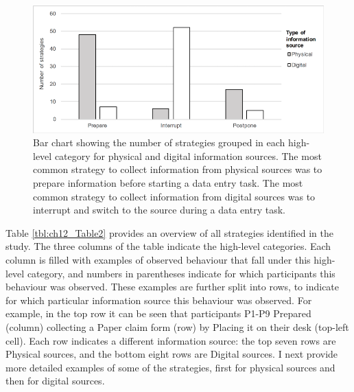 \begin{figure}
\centering
\includegraphics[scale=0.8]{images/ch12/ch12_graph.pdf}
\caption[Study 2 bar chart of interruption strategies]{Bar chart showing the number of strategies grouped in each high-level category for physical and digital information sources. The most common strategy to collect information from physical sources was to prepare information before starting a data entry task. The most common strategy to collect information from digital sources was to interrupt and switch to the source during a data entry task.}
\label{fig:ch12_graph}
\end{figure}

Table \ref{tbl:ch12_Table2} provides an overview of all strategies identified in the study. The three columns of the table indicate the high-level categories. Each column is filled with examples of observed behaviour that fall under this high-level category, and numbers in parentheses indicate for which participants this behaviour was observed. These examples are further split into rows, to indicate for which particular information source this behaviour was observed. For example, in the top row it can be seen that participants P1-P9 Prepared (column) collecting a Paper claim form (row) by Placing it on their desk (top-left cell). Each row indicates a different information source: the top seven rows are Physical sources, and the bottom eight rows are Digital sources. I next provide more detailed examples of some of the strategies, first for physical sources and then for digital sources.


